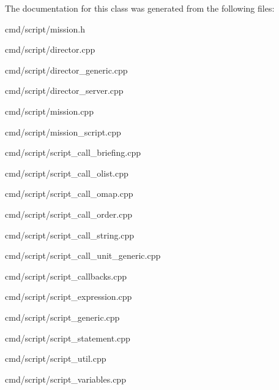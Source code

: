 The documentation for this class was generated from the following files\+:\begin{DoxyCompactItemize}
\item 
cmd/script/mission.\+h\item 
cmd/script/director.\+cpp\item 
cmd/script/director\+\_\+generic.\+cpp\item 
cmd/script/director\+\_\+server.\+cpp\item 
cmd/script/mission.\+cpp\item 
cmd/script/mission\+\_\+script.\+cpp\item 
cmd/script/script\+\_\+call\+\_\+briefing.\+cpp\item 
cmd/script/script\+\_\+call\+\_\+olist.\+cpp\item 
cmd/script/script\+\_\+call\+\_\+omap.\+cpp\item 
cmd/script/script\+\_\+call\+\_\+order.\+cpp\item 
cmd/script/script\+\_\+call\+\_\+string.\+cpp\item 
cmd/script/script\+\_\+call\+\_\+unit\+\_\+generic.\+cpp\item 
cmd/script/script\+\_\+callbacks.\+cpp\item 
cmd/script/script\+\_\+expression.\+cpp\item 
cmd/script/script\+\_\+generic.\+cpp\item 
cmd/script/script\+\_\+statement.\+cpp\item 
cmd/script/script\+\_\+util.\+cpp\item 
cmd/script/script\+\_\+variables.\+cpp\end{DoxyCompactItemize}
